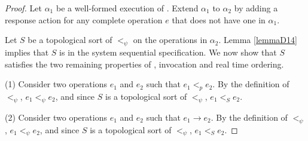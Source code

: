 \begin{proof}
    Let $\alpha_1$ be a well-formed execution of \sys{}. Extend $\alpha_1$ to $\alpha_2$ by adding a response action for any complete operation $e$ that does not have one in $\alpha_1$.

    Let $S$ be a topological sort of $<_\psi$ on the operations in $\alpha_2$. Lemma \ref{lemmaD14} implies that $S$ is in the system sequential specification. We now show that $S$ satisfies the two remaining properties of \mdllong{}, invocation and real time ordering.

    (1) Consider two operations $e_1$ and $e_2$ such that $e_1 <_p e_2$. By the definition of $<_\psi$, $e_1 <_\psi e_2$, and since $S$ is a topological sort of $<_\psi$, $e_1 <_S e_2$.
    
    (2) Consider two operations $e_1$ and $e_2$ such that $e_1 \rightarrow e_2$. By the definition of $<_\psi$, $e_1 <_\psi e_2$, and since $S$ is a topological sort of $<_\psi$, $e_1 <_S e_2$.
\end{proof}